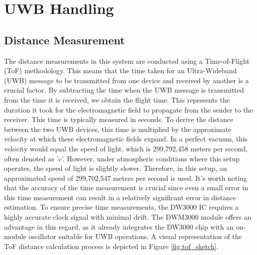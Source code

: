 \chapter{UWB Handling}

\section{Distance Measurement}
\label{sec:Distance_Measurement}
The distance measurements in this system are conducted using a Time-of-Flight (ToF) methodology. This means that the time taken for an Ultra-Wideband (UWB) message to be transmitted from one device and received by another is a crucial factor. By subtracting the time when the UWB message is transmitted from the time it is received, we obtain the flight time. This represents the duration it took for the electromagnetic field to propagate from the sender to the receiver. This time is typically measured in seconds.
\vspace{4pt}
\newline
To derive the distance between the two UWB devices, this time is multiplied by the approximate velocity at which these electromagnetic fields expand. In a perfect vacuum, this velocity would equal the speed of light, which is 299,792,458 meters per second, often denoted as 'c'. However, under atmospheric conditions where this setup operates, the speed of light is slightly slower. Therefore, in this setup, an approximated speed of 299,702,547 meters per second is used. 
\vspace{4pt}
\newline
It's worth noting that the accuracy of the time measurement is crucial since even a small error in this time measurement can result in a relatively significant error in distance estimation. To ensure precise time measurements, the DW3000 IC requires a highly accurate clock signal with minimal drift. The DWM3000 module offers an advantage in this regard, as it already integrates the DW3000 chip with an on-module oscillator suitable for UWB operations.
A visual representation of the ToF distance calculation process is depicted in Figure \ref{fig:tof_sketch}.

